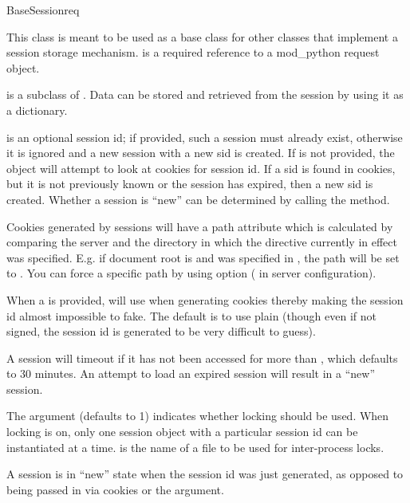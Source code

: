 \begin{classdesc}{BaseSession}{req}

  This class is meant to be used as a base class for other classes
  that implement a session storage mechanism.  is a required
  reference to a mod_python request object.

   is a subclass of . Data can be
  stored and retrieved from the session by using it as a
  dictionary. 

   is an optional session id; if provided, such a session
  must already exist, otherwise it is ignored and a new session with a
  new sid is created. If  is not provided, the object will
  attempt to look at cookies for session id. If a sid is found in
  cookies, but it is not previously known or the session has expired,
  then a new sid is created. Whether a session is ``new'' can be
  determined by calling the  method.

  Cookies generated by sessions will have a path attribute which is
  calculated by comparing the server  and the
  directory in which the  directive currently in
  effect was specified. E.g. if document root is  and
   was specified in , the path
  will be set to . You can force a specific path by using
   option ( in server configuration).

  When a  is provided,  will use
   when generating cookies thereby making the
  session id almost impossible to fake. The default is to use plain
   (though even if not signed, the session id is
  generated to be very difficult to guess).

  A session will timeout if it has not been accessed for more than
  , which defaults to 30 minutes. An attempt to load an
  expired session will result in a ``new'' session.

  The  argument (defaults to 1) indicates whether locking
  should be used. When locking is on, only one session object with a
  particular session id can be instantiated at a time. 
  is the name of a file to be used for inter-process locks.

  A session is in ``new'' state when the session id was just
  generated, as opposed to being passed in via cookies or the
   argument.



\end{classdesc}

